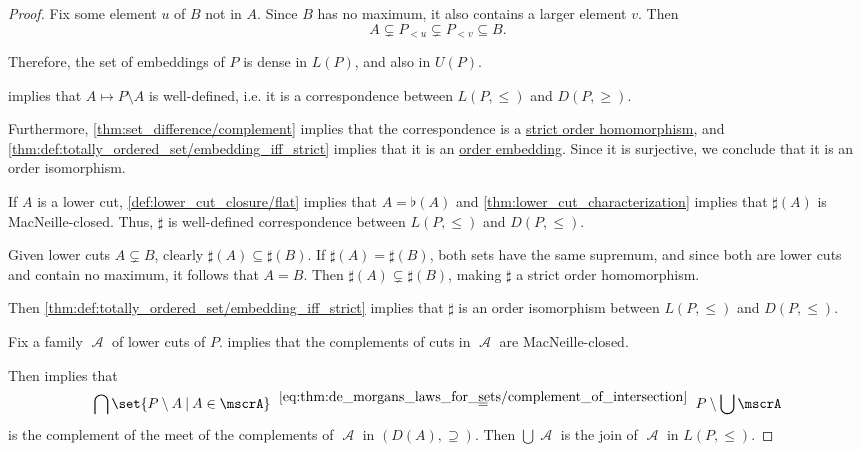 \begin{proof}
  Fix some element \( u \) of \( B \) not in \( A \). Since \( B \) has no maximum, it also contains a larger element \( v \). Then
  \begin{equation*}
    A \subsetneq P_{< u} \subsetneq P_{< v} \subseteq B.
  \end{equation*}

  Therefore, the set of embeddings of \( P \) is dense in \( L(P) \), and also in \( U(P) \).

    implies that \( A \mapsto P \setminus A \) is well-defined, i.e. it is a correspondence between \( L(P, \leq) \) and \( D(P, \geq) \).

  Furthermore, \cref{thm:set_difference/complement} implies that the correspondence is a \hyperref[def:order_function/preserving]{strict order homomorphism}, and \cref{thm:def:totally_ordered_set/embedding_iff_strict} implies that it is an \hyperref[def:preordered_set/homomorphism]{order embedding}. Since it is surjective, we conclude that it is an order isomorphism.

   If \( A \) is a lower cut, \cref{def:lower_cut_closure/flat} implies that \( A = \flat(A) \) and \cref{thm:lower_cut_characterization} implies that \( \sharp(A) \) is MacNeille-closed. Thus, \( \sharp \) is well-defined correspondence between \( L(P, \leq) \) and \( D(P, \leq) \).

  Given lower cuts \( A \subsetneq B \), clearly \( \sharp(A) \subseteq \sharp(B) \). If \( \sharp(A) = \sharp(B) \), both sets have the same supremum, and since both are lower cuts and contain no maximum, it follows that \( A = B \). Then \( \sharp(A) \subsetneq \sharp(B) \), making \( \sharp \) a strict order homomorphism.

  Then \cref{thm:def:totally_ordered_set/embedding_iff_strict} implies that \( \sharp \) is an order isomorphism between \( L(P, \leq) \) and \( D(P, \leq) \).

   Fix a family \( \mscrA \) of lower cuts of \( P \).  implies that the complements of cuts in \( \mscrA \) are MacNeille-closed.

  Then  implies that
  \begin{equation*}
    \bigcap \set{ P \setminus A \given A \in \mscrA }
    \reloset {\eqref{eq:thm:de_morgans_laws_for_sets/complement_of_intersection}} =
    P \setminus \bigcup \mscrA
  \end{equation*}
  is the complement of the meet of the complements of \( \mscrA \) in \( (D(A), \supseteq) \). Then \( \bigcup \mscrA \) is the join of \( \mscrA \) in \( L(P, \leq) \).


\end{proof}
